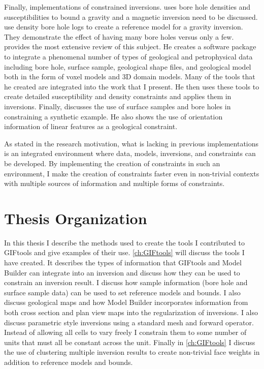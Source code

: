 Finally, implementations of constrained inversions. \cite{phillips2001thesis} uses bore hole densities and susceptibilities to bound a gravity and a magnetic inversion need to be discussed. \cite{farquharson2008geologically} use density bore hole logs to create a reference model for a gravity inversion. They demonstrate the effect of having many bore holes versus only a few. \cite{williams2008geologically}  provides the most extensive review of this subject. He creates a software package to integrate a phenomenal number of types of geological and petrophysical data including bore hole, surface sample, geological shape files, and geological model both in the form of voxel models and 3D domain models. Many of the tools that he created are integrated into the work that I present. He then uses these tools to create detailed susceptibility and density constraints and applies them in inversions. Finally, \cite{Lelievre2009Integrating} discusses the use of surface samples and bore holes in constraining a synthetic example. He also shows the use of orientation information of linear features as a geological constraint. 

As stated in the research motivation, what is lacking in previous implementations is an integrated environment where data, models, inversions, and constraints can be developed. By implementing the creation of constraints in such an environment, I make the creation of constraints faster even in non-trivial contexts with multiple sources of information and multiple forms of constraints.

\section{Thesis Organization}
\label{sec:Thesis Organization}
		
In this thesis I describe the methods used to create the tools I contributed to GIFtools and give examples of their use. \autoref{ch:GIFtools} will discuss the tools I have created. It  describes the types of information that GIFtools and Model Builder can integrate into an inversion and discuss how they can be used to constrain an inversion result. I discuss how sample information (bore hole and surface sample data) can be used to set reference models and bounds. I also discuss geological maps and how Model Builder incorporates information from both cross section and plan view maps into the regularization of inversions. I also discuss parametric style inversions using a standard mesh and forward operator. Instead of allowing all cells to vary freely I constrain them to some number of units that must all be constant across the unit. Finally in \autoref{ch:GIFtools}  I discuss the use of clustering multiple inversion results to create non-trivial face weights in addition to reference models and bounds.

